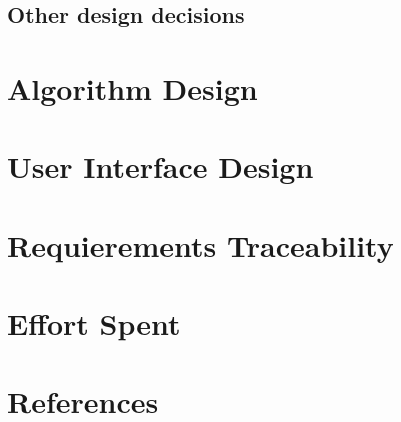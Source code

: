 \documentclass[12pt]{article}
\begin{document}
	\subsection{Other design decisions}
	\newpage
	
		
	
	\section{Algorithm Design}
	\newpage
	
		
	\section{User Interface Design}
	\newpage
	
		
	
	\section{Requierements Traceability}
	\newpage
	
		
	
	\section{Effort Spent}
	\newpage
	
		
	
	\section{References}

	 
	
\end{document}
